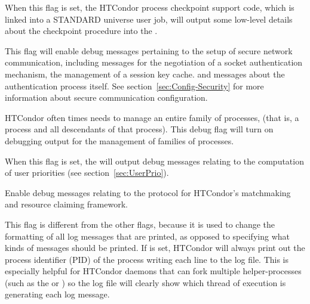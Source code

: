 \begin{description}
\begin{description}
  \label{dflag:ckpt}
  \item[\Dflag{CKPT}]
    When this flag is set,
    the HTCondor process checkpoint support code, which is linked into a STANDARD 
    universe user job, will output some low-level details about the checkpoint
    procedure into the .

  \label{dflag:security}
  \item[\Dflag{SECURITY}]
    This flag will enable debug messages pertaining to the setup of 
    secure network communication, 
    including messages for the negotiation of a socket 
    authentication mechanism, the management of a session key cache.
    and messages about the authentication process itself.  See
    section~\ref{sec:Config-Security} for more information about
    secure communication configuration.

  \label{dflag:procfamily}
  \item[\Dflag{PROCFAMILY}]
    HTCondor often times needs to manage an entire family of processes, (that
    is, a 
    process and all descendants of that process).  This debug flag will 
    turn on debugging output for the management of families of processes.

  \label{dflag:accountant}
  \item[\Dflag{ACCOUNTANT}]
    When this flag is set,
    the  will output debug messages relating to the computation
    of user priorities (see section~\ref{sec:UserPrio}).

  \label{dflag:protocol}
  \item[\Dflag{PROTOCOL}]
    Enable debug messages relating to the protocol for HTCondor's matchmaking and
    resource claiming framework.
    
  \label{dflag:pid}
  \item[\Dflag{PID}]
    This flag is different from the other flags, because it is
    used to change the formatting of all log messages that are printed,
    as opposed to specifying what kinds of messages should be printed.
    If  is set, HTCondor will always print out the process
    identifier (PID) of the process writing each line to the log file.
    This is especially helpful for HTCondor daemons that can fork
    multiple helper-processes (such as the  or
    ) so the log file will clearly show which thread
    of execution is generating each log message.
    

\end{description}
\end{description}
